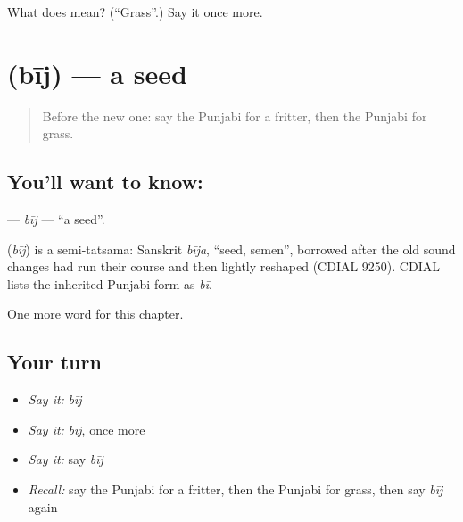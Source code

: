 \begin{tcolorbox}[breakable,colback=teal!4,colframe=teal!35!black,title={Before you move on}]
What does  mean? (\textquotedblleft{}Grass\textquotedblright{}.) Say it once more.
\end{tcolorbox}
\section[\texorpdfstring{\pa{ਬੀਜ} (bīj)}{ਬੀਜ (bīj)}]{ (bīj) — a seed}

\label{lesson:PA-C126-bij}



\begin{quote}
Before the new one: say the Punjabi for a fritter, then the Punjabi for grass.
\end{quote}

\subsection*{You'll want to know: }
\textbf{} — \emph{bīj} — \textquotedblleft{}a seed\textquotedblright{}.

\begin{cousinweb}
\textbf{} (\emph{bīj}) is a semi-tatsama: Sanskrit \emph{bīja}, \textquotedblleft{}seed, semen\textquotedblright{}, borrowed after the old sound changes had run their course and then lightly reshaped (CDIAL 9250). CDIAL lists the inherited Punjabi form as \emph{bī}.
\end{cousinweb}

\begin{grammarlens}[title={What you've built}]
One more word for this chapter.
\end{grammarlens}

\subsection*{Your turn}
\begin{itemize}
\raggedright
  \item \emph{Say it:} \emph{bīj}
  \item \emph{Say it:} \emph{bīj}, once more
  \item \emph{Say it:} say \emph{bīj}
  \item \emph{Recall:} say the Punjabi for a fritter, then the Punjabi for grass, then say \emph{bīj} again
\end{itemize}

